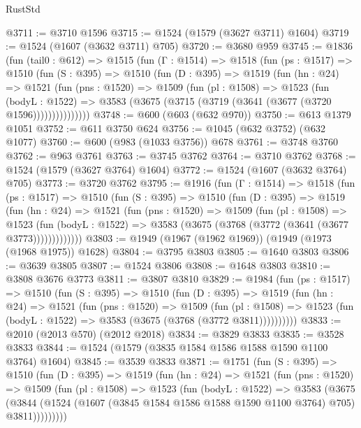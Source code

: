 \begin{lexlean}{RustStd}
\begin{coremodule}
@3711 := @3710 @1596
@3715 := @1524 (@1579 (@3627 @3711) @1604)
@3719 := @1524 (@1607 (@3632 @3711) @705)
@3720 := @3680 @959
@3745 := @1836
    (fun (tail0 : @612) =>
    @1515
      (fun (Γ : @1514) =>
      @1518
        (fun (ps : @1517) =>
        @1510
          (fun (S : @395) =>
          @1510
            (fun (D : @395) =>
            @1519
              (fun (hn : @24) =>
              @1521
                (fun (pns : @1520) =>
                @1509
                  (fun (pl : @1508) =>
                  @1523
                    (fun (bodyL : @1522) =>
                    @3583 (@3675 (@3715 (@3719 (@3641 (@3677 (@3720 @1596)))))))))))))))
@3748 := @600 (@603 (@632 @970))
@3750 := @613 @1379 @1051
@3752 := @611 @3750 @624
@3756 := @1045 (@632 @3752) (@632 @1077)
@3760 := @600 (@983 (@1033 @3756)) @678
@3761 := @3748 @3760
@3762 := @963 @3761
@3763 := @3745 @3762
@3764 := @3710 @3762
@3768 := @1524 (@1579 (@3627 @3764) @1604)
@3772 := @1524 (@1607 (@3632 @3764) @705)
@3773 := @3720 @3762
@3795 := @1916
    (fun (Γ : @1514) =>
    @1518
      (fun (ps : @1517) =>
      @1510
        (fun (S : @395) =>
        @1510
          (fun (D : @395) =>
          @1519
            (fun (hn : @24) =>
            @1521
              (fun (pns : @1520) =>
              @1509
                (fun (pl : @1508) =>
                @1523
                  (fun (bodyL : @1522) =>
                  @3583 (@3675 (@3768 (@3772 (@3641 (@3677 @3773)))))))))))))
@3803 := @1949 (@1967 (@1962 @1969)) (@1949 (@1973 (@1968 @1975)) @1628)
@3804 := @3795 @3803
@3805 := @1640 @3803
@3806 := @3639 @3805
@3807 := @1524 @3806
@3808 := @1648 @3803
@3810 := @3808 @3676 @3773
@3811 := @3807 @3810
@3829 := @1984
    (fun (ps : @1517) =>
    @1510
      (fun (S : @395) =>
      @1510
        (fun (D : @395) =>
        @1519
          (fun (hn : @24) =>
          @1521
            (fun (pns : @1520) =>
            @1509
              (fun (pl : @1508) =>
              @1523 (fun (bodyL : @1522) => @3583 (@3675 (@3768 (@3772 @3811))))))))))
@3833 := @2010 (@2013 @570) (@2012 @2018)
@3834 := @3829 @3833
@3835 := @3528 @3833
@3844 := @1524 (@1579 (@3835 @1584 @1586 @1588 @1590 @1100 @3764) @1604)
@3845 := @3539 @3833
@3871 := @1751
    (fun (S : @395) =>
    @1510
      (fun (D : @395) =>
      @1519
        (fun (hn : @24) =>
        @1521
          (fun (pns : @1520) =>
          @1509
            (fun (pl : @1508) =>
            @1523
              (fun (bodyL : @1522) =>
              @3583
                (@3675
                  (@3844
                    (@1524 (@1607 (@3845 @1584 @1586 @1588 @1590 @1100 @3764) @705) @3811)))))))))

\end{coremodule}
\end{lexlean}
